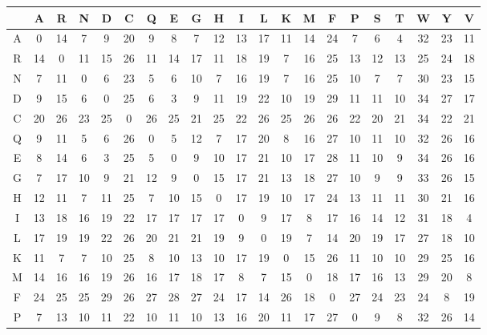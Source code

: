 \begin{mytable}
    \begin{tabular}{c|cccccccccccccccccccc}
        & A  & R  & N  & D  & C  & Q  & E  & G  & H  & I  & L  & K  & M  & F  & P  & S  & T  & W  & Y  & V  \\
        \hline
        A & 0  & 14 & 7  & 9  & 20 & 9  & 8  & 7  & 12 & 13 & 17 & 11 & 14 & 24 & 7  & 6  & 4  & 32 & 23 & 11 \\
        R & 14 & 0  & 11 & 15 & 26 & 11 & 14 & 17 & 11 & 18 & 19 & 7  & 16 & 25 & 13 & 12 & 13 & 25 & 24 & 18 \\
        N & 7  & 11 & 0  & 6  & 23 & 5  & 6  & 10 & 7  & 16 & 19 & 7  & 16 & 25 & 10 & 7  & 7  & 30 & 23 & 15 \\
        D & 9  & 15 & 6  & 0  & 25 & 6  & 3  & 9  & 11 & 19 & 22 & 10 & 19 & 29 & 11 & 11 & 10 & 34 & 27 & 17 \\
        C & 20 & 26 & 23 & 25 & 0  & 26 & 25 & 21 & 25 & 22 & 26 & 25 & 26 & 26 & 22 & 20 & 21 & 34 & 22 & 21 \\
        Q & 9  & 11 & 5  & 6  & 26 & 0  & 5  & 12 & 7  & 17 & 20 & 8  & 16 & 27 & 10 & 11 & 10 & 32 & 26 & 16 \\
        E & 8  & 14 & 6  & 3  & 25 & 5  & 0  & 9  & 10 & 17 & 21 & 10 & 17 & 28 & 11 & 10 & 9  & 34 & 26 & 16 \\
        G & 7  & 17 & 10 & 9  & 21 & 12 & 9  & 0  & 15 & 17 & 21 & 13 & 18 & 27 & 10 & 9  & 9  & 33 & 26 & 15 \\
        H & 12 & 11 & 7  & 11 & 25 & 7  & 10 & 15 & 0  & 17 & 19 & 10 & 17 & 24 & 13 & 11 & 11 & 30 & 21 & 16 \\
        I & 13 & 18 & 16 & 19 & 22 & 17 & 17 & 17 & 17 & 0  & 9  & 17 & 8  & 17 & 16 & 14 & 12 & 31 & 18 & 4  \\
        L & 17 & 19 & 19 & 22 & 26 & 20 & 21 & 21 & 19 & 9  & 0  & 19 & 7  & 14 & 20 & 19 & 17 & 27 & 18 & 10 \\
        K & 11 & 7  & 7  & 10 & 25 & 8  & 10 & 13 & 10 & 17 & 19 & 0  & 15 & 26 & 11 & 10 & 10 & 29 & 25 & 16 \\
        M & 14 & 16 & 16 & 19 & 26 & 16 & 17 & 18 & 17 & 8  & 7  & 15 & 0  & 18 & 17 & 16 & 13 & 29 & 20 & 8  \\
        F & 24 & 25 & 25 & 29 & 26 & 27 & 28 & 27 & 24 & 17 & 14 & 26 & 18 & 0  & 27 & 24 & 23 & 24 & 8  & 19 \\
        P & 7  & 13 & 10 & 11 & 22 & 10 & 11 & 10 & 13 & 16 & 20 & 11 & 17 & 27 & 0  & 9  & 8  & 32 & 26 & 14 \\

\end{tabular}
\end{mytable}
